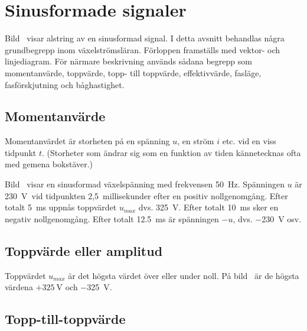 \newpage
\section{Sinusformade signaler}


Bild~ visar alstring av en sinusformad signal.
I detta avsnitt behandlas några grundbegrepp inom växelströmsläran.
Förloppen framställs med vektor- och linjediagram.
För närmare beskrivning används sådana begrepp som momentanvärde,
toppvärde, topp- till toppvärde, effektivvärde, fasläge, fasförskjutning och
båghastighet.

\subsection{Momentanvärde}

Momentanvärdet är storheten på en spänning \(u\), en ström \(i\) etc. vid en
viss tidpunkt \(t\).
(Storheter som ändrar sig som en funktion av tiden kännetecknas ofta med gemena
bokstäver.)

Bild~ visar en sinusformad växelspänning med frekvensen
\qty{50}{\hertz}.
Spänningen \(u\) är \qty[retain-explicit-plus]{+230}{\volt}\ vid tidpunkten
2,5~millisekunder efter en positiv nollgenomgång.
Efter totalt \qty{5}{\milli\second} uppnås toppvärdet \(u_{max}\) dvs.
\qty[retain-explicit-plus]{+325}{\volt}.
Efter totalt \qty{10}{\milli\second} sker en negativ nollgenomgång.
Efter totalt \qty{12,5}{\milli\second} är spänningen \(-u\), dvs.
\qty{-230}{\volt} osv.

\subsection{Toppvärde eller amplitud}
\label{subsec:toppvaerde}

Toppvärdet \(u_{max}\) är det högsta värdet över eller under noll.
På bild~ är de högsta värdena \(+325\ \text{V}\) och
\qty{-325}{\volt}.

\subsection{Topp-till-toppvärde}
\label{peak-to-peak-värde}

